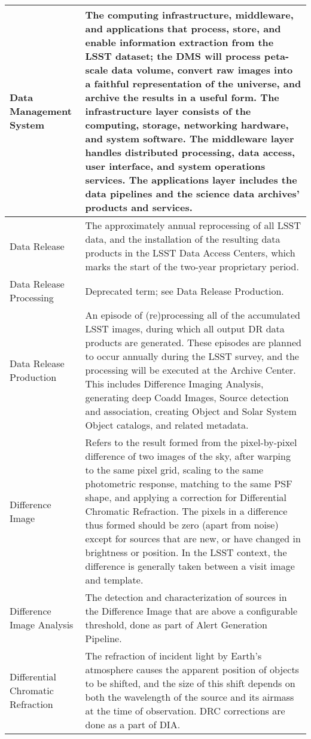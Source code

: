 \begin{longtable}{|l|p{}|}
Data Management System & The computing infrastructure, middleware, and applications that process, store, and enable information extraction from the \gls{LSST} dataset; the \gls{DMS} will process peta-scale data volume, convert raw images into a faithful representation of the universe, and archive the results in a useful form. The infrastructure layer consists of the computing, storage, networking hardware, and system software. The middleware layer handles distributed processing, data access, user interface, and system operations services. The applications layer includes the data pipelines and the science data archives' products and services. \\\hline
Data Release & The approximately annual reprocessing of all \gls{LSST} data, and the installation of the resulting data products in the \gls{LSST} Data Access Centers, which marks the start of the two-year proprietary period. \\\hline
Data Release Processing & Deprecated term; see \gls{Data Release Production}. \\\hline
Data Release Production & An episode of (re)processing all of the accumulated \gls{LSST} images, during which all output \gls{DR} data products are generated. These episodes are planned to occur annually during the \gls{LSST} survey, and the processing will be executed at the \gls{Archive} \gls{Center}. This includes Difference Imaging Analysis, generating deep Coadd Images, \gls{Source} detection and association, creating \gls{Object} and Solar System \gls{Object} catalogs, and related \gls{metadata}. \\\hline
Difference Image & Refers to the result formed from the pixel-by-pixel difference of two images of the sky, after warping to the same pixel grid, scaling to the same photometric response, matching to the same \gls{PSF} \gls{shape}, and applying a correction for \gls{Differential Chromatic Refraction}. The pixels in a difference thus formed should be zero (apart from noise) except for sources that are new, or have changed in brightness or position. In the \gls{LSST} context, the difference is generally taken between a visit image and template.  \\\hline
Difference Image Analysis & The detection and characterization of sources in the \gls{Difference Image} that are above a configurable threshold, done as part of \gls{Alert} Generation Pipeline. \\\hline
Differential Chromatic Refraction & The refraction of incident light by Earth's atmosphere causes the apparent position of objects to be shifted, and the size of this shift depends on both the wavelength of the source and its \gls{airmass} at the time of observation. DRC corrections are done as a part of DIA. \\\hline

\end{longtable}
